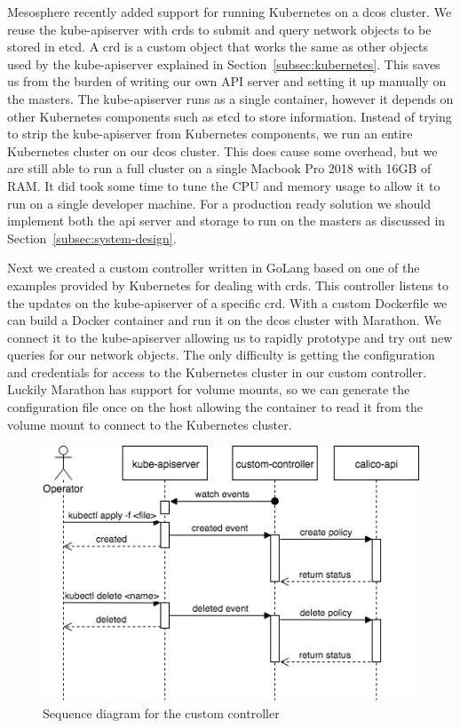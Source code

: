 Mesosphere recently added support for running Kubernetes on a \gls{dcos} cluster. We reuse the kube-apiserver with \glspl{crd} to submit and query network objects to be stored in etcd. A \gls{crd} is a custom object that works the same as other objects used by the kube-apiserver explained in Section~\ref{subsec:kubernetes}. This saves us from the burden of writing our own API server and setting it up manually on the masters. The kube-apiserver runs as a single container, however it depends on other Kubernetes components such as etcd to store information. Instead of trying to strip the kube-apiserver from Kubernetes components, we run an entire Kubernetes cluster on our \gls{dcos} cluster. This does cause some overhead, but we are still able to run a full cluster on a single Macbook Pro 2018 with 16GB of RAM. It did took some time to tune the CPU and memory usage to allow it to run on a single developer machine. For a production ready solution we should implement both the \gls{api} server and storage to run on the masters as discussed in Section~\ref{subsec:system-design}.

Next we created a custom controller written in GoLang\cite{golang} based on one of the examples provided by Kubernetes for dealing with \glspl{crd}. This controller listens to the updates on the kube-apiserver of a specific \gls{crd}. With a custom Dockerfile we can build a Docker container and run it on the \gls{dcos} cluster with Marathon. We connect it to the kube-apiserver allowing us to rapidly prototype and try out new queries for our network objects. The only difficulty is getting the configuration and credentials for access to the Kubernetes cluster in our custom controller. Luckily Marathon has support for volume mounts, so we can generate the configuration file once on the host allowing the container to read it from the volume mount to connect to the Kubernetes cluster.

\begin{figure}
    \centering
    \includegraphics[width=0.7\columnwidth]{images/customer-controller-sequence-diagram}
    \caption{Sequence diagram for the custom controller}
    \label{fig:custrom-controller-sequence-diagram}
\end{figure}

